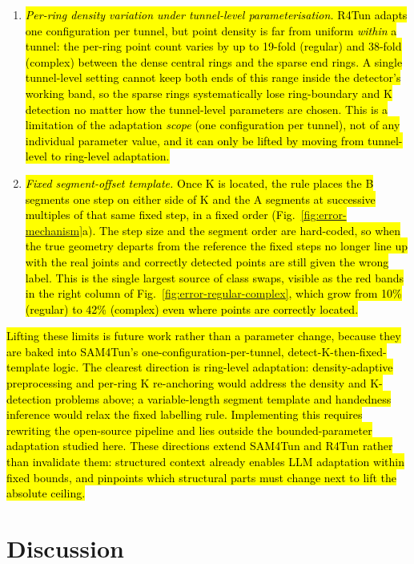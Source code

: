 \documentclass[a4paper,fleqn]{cas-dc}
\begin{document}
{\begin{enumerate}
\item \hl{\emph{Per-ring density variation under tunnel-level parameterisation.} R4Tun adapts one configuration per tunnel, but point density is far from uniform \emph{within} a tunnel: the per-ring point count varies by up to 19-fold (regular) and 38-fold (complex) between the dense central rings and the sparse end rings. A single tunnel-level setting cannot keep both ends of this range inside the detector's working band, so the sparse rings systematically lose ring-boundary and K detection no matter how the tunnel-level parameters are chosen. This is a limitation of the adaptation \emph{scope} (one configuration per tunnel), not of any individual parameter value, and it can only be lifted by moving from tunnel-level to ring-level adaptation.}
\item \hl{\emph{Fixed segment-offset template.} Once K is located, the rule places the B segments one step on either side of K and the A segments at successive multiples of that same fixed step, in a fixed order (Fig.~\ref{fig:error-mechanism}a). The step size and the segment order are hard-coded, so when the true geometry departs from the reference the fixed steps no longer line up with the real joints and correctly detected points are still given the wrong label. This is the single largest source of class swaps, visible as the red bands in the right column of Fig.~\ref{fig:error-regular-complex}, which grow from 10\% (regular) to 42\% (complex) even where points are correctly located.}
\end{enumerate}

\hl{Lifting these limits is future work rather than a parameter change, because they are baked into SAM4Tun's one-configuration-per-tunnel, detect-K-then-fixed-template logic. The clearest direction is ring-level adaptation: density-adaptive preprocessing and per-ring K re-anchoring would address the density and K-detection problems above; a variable-length segment template and handedness inference would relax the fixed labelling rule. Implementing this requires rewriting the open-source pipeline and lies outside the bounded-parameter adaptation studied here. These directions extend SAM4Tun and R4Tun rather than invalidate them: structured context already enables LLM adaptation within fixed bounds, and pinpoints which structural parts must change next to lift the absolute ceiling.}


\section{Discussion}\label{sec:discussion}

}
\end{document}
